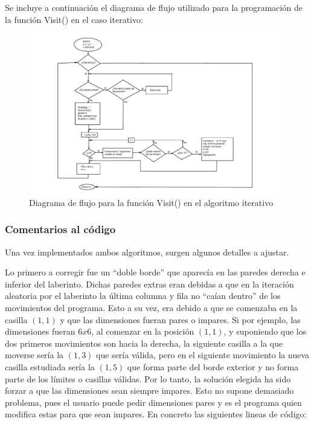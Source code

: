 \documentclass[12pt,a4paper]{article}
\begin{document}
Se incluye a continuación el diagrama de flujo utilizado para la programación de la función \textsf{Visit()} en el caso iterativo:

\begin{figure}[H]
	\hspace{-4.3cm}
	\includegraphics[scale=1.05]{fotos/diagrama.pdf}
	\caption{Diagrama de flujo para la función \textsf{Visit()} en el algoritmo iterativo}
	\label{diagrama}
\end{figure}

\subsubsection{Comentarios al código}

Una vez implementados ambos algoritmos, surgen algunos detalles a ajustar.

Lo primero a corregir fue un ``doble borde'' que aparecía en las paredes derecha e inferior del laberinto. Dichas paredes extras eran debidas a que en la iteración aleatoria por el laberinto la última columna y fila no ``caían dentro'' de los movimientos del programa. Esto a su vez, era debido a que se comenzaba en la casilla $(1,1)$ y que las dimensiones fueran pares o impares. Si por ejemplo, las dimensiones fueran $6x6$, al comenzar en la posición $(1,1)$, y suponiendo que los dos primeros movimientos son hacia la derecha, la siguiente casilla a la que moverse sería la $(1,3)$ que sería válida, pero en el siguiente movimiento la nueva casilla estudiada sería la $(1,5)$ que forma parte del borde exterior y no forma parte de los límites o casillas válidas. Por lo tanto, la solución elegida ha sido forzar a que las dimensiones sean siempre impares. Esto no supone demasiado problema, pues el usuario puede pedir dimensiones pares y es el programa quien modifica estas para que sean impares. En concreto las siguientes lineas de código:
\end{document}
